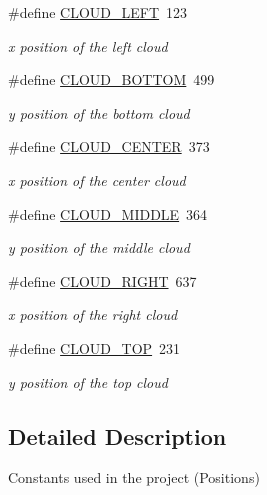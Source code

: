 \begin{DoxyCompactItemize}
\#define \hyperlink{group___project_ga85e97d25fd7a10c54c29ac08a4fd74ad}{C\+L\+O\+U\+D\+\_\+\+L\+E\+FT}~123
\begin{DoxyCompactList}\small\item\em x position of the left cloud \end{DoxyCompactList}\item 
\mbox{\label{group___project_ga6e787ba8eeb46205993d1abe8626c645}} 
\#define \hyperlink{group___project_ga6e787ba8eeb46205993d1abe8626c645}{C\+L\+O\+U\+D\+\_\+\+B\+O\+T\+T\+OM}~499
\begin{DoxyCompactList}\small\item\em y position of the bottom cloud \end{DoxyCompactList}\item 
\mbox{\label{group___project_ga991472af3a200398091d4aff320c39c3}} 
\#define \hyperlink{group___project_ga991472af3a200398091d4aff320c39c3}{C\+L\+O\+U\+D\+\_\+\+C\+E\+N\+T\+ER}~373
\begin{DoxyCompactList}\small\item\em x position of the center cloud \end{DoxyCompactList}\item 
\mbox{\label{group___project_ga932f44a9498226d1c0e77e1719fff5b4}} 
\#define \hyperlink{group___project_ga932f44a9498226d1c0e77e1719fff5b4}{C\+L\+O\+U\+D\+\_\+\+M\+I\+D\+D\+LE}~364
\begin{DoxyCompactList}\small\item\em y position of the middle cloud \end{DoxyCompactList}\item 
\mbox{\label{group___project_ga20af2feb4b4baf6e39563920039be433}} 
\#define \hyperlink{group___project_ga20af2feb4b4baf6e39563920039be433}{C\+L\+O\+U\+D\+\_\+\+R\+I\+G\+HT}~637
\begin{DoxyCompactList}\small\item\em x position of the right cloud \end{DoxyCompactList}\item 
\mbox{\label{group___project_ga56cae3f2b16b04723083eaa02e98b289}} 
\#define \hyperlink{group___project_ga56cae3f2b16b04723083eaa02e98b289}{C\+L\+O\+U\+D\+\_\+\+T\+OP}~231
\begin{DoxyCompactList}\small\item\em y position of the top cloud \end{DoxyCompactList}\end{DoxyCompactItemize}


\subsection{Detailed Description}
Constants used in the project (Positions) 